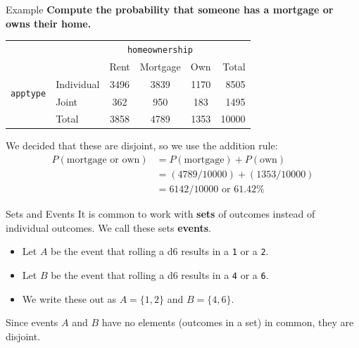 \begin{frame}{Example}
    \textbf{Compute the probability that someone has a mortgage or owns their home.}
    \begin{center}
        \begin{tabular}{r l ccc r}
		& & \multicolumn{3}{c}{{\texttt{homeownership}}} & \\
        \cline{3-5}
		& & Rent & Mortgage & Own & Total  \\ 
        \cline{2-6}
        \multirow{2}{*}{{\texttt{apptype}}} 
        & Individual & 3496 & 3839 & 1170 & 8505 \\ 
  		& Joint & 362 & 950 & 183 & 1495 \\ 
        \cline{2-6}
  		& Total	& 3858 & 4789 & 1353 & 10000 \\
        \cline{2-6}
    \end{tabular}
    \end{center}
    \vspace{12pt}We decided that these are disjoint, so we use the addition rule:
    \begin{align*}
        P(\text{mortgage or own}) &=P(\text{mortgage})+P(\text{own}) \\
        & =(4789/10000)+(1353/10000) \\
        & =6142/10000 \text{ or 61.42\%}
    \end{align*}
\end{frame}

\begin{frame}{Sets and Events}
    It is common to work with \textbf{sets} of outcomes instead of individual outcomes. We call these sets \textbf{events}.
    
    \begin{itemize}
        \item Let $A$ be the event that rolling a d6 results in a \texttt{1} or a \texttt{2}.
        \item Let $B$ be the event that rolling a d6 results in a \texttt{4} or a \texttt{6}.
        \item We write these out as $A=\{1,2\}$ and $B=\{4,6\}$.
    \end{itemize}
    Since events $A$ and $B$ have no elements (outcomes in a set) in common, they are disjoint.
\end{frame}

